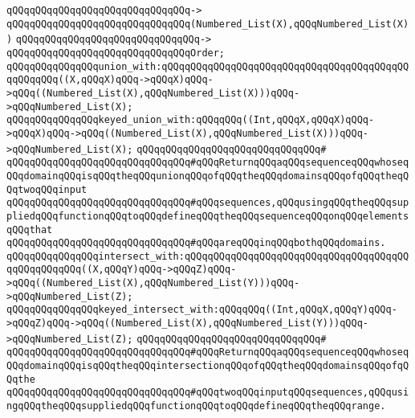 \verb|qQQqqQQqqQQqqQQqqQQqqQQqqQQqqQQq->|\newline
\verb|qQQqqQQqqQQqqQQqqQQqqQQqqQQqqQQq(Numbered_List(X),qQQqNumbered_List(X))|\newline
\verb|qQQqqQQqqQQqqQQqqQQqqQQqqQQqqQQq->|\newline
\verb|qQQqqQQqqQQqqQQqqQQqqQQqqQQqqQQqOrder;|\newline
\newline
\verb|qQQqqQQqqQQqqQQqunion_with:qQQqqQQqqQQqqQQqqQQqqQQqqQQqqQQqqQQqqQQqqQQqqQQqqQQq((X,qQQqX)qQQq->qQQqX)qQQq->qQQq((Numbered_List(X),qQQqNumbered_List(X)))qQQq->qQQqNumbered_List(X);|\newline
\verb|qQQqqQQqqQQqqQQqkeyed_union_with:qQQqqQQq((Int,qQQqX,qQQqX)qQQq->qQQqX)qQQq->qQQq((Numbered_List(X),qQQqNumbered_List(X)))qQQq->qQQqNumbered_List(X);|\newline
\verb|qQQqqQQqqQQqqQQqqQQqqQQqqQQqqQQq#|\newline
\verb|qQQqqQQqqQQqqQQqqQQqqQQqqQQqqQQq#qQQqReturnqQQqaqQQqsequenceqQQqwhoseqQQqdomainqQQqisqQQqtheqQQqunionqQQqofqQQqtheqQQqdomainsqQQqofqQQqtheqQQqtwoqQQqinput|\newline
\verb|qQQqqQQqqQQqqQQqqQQqqQQqqQQqqQQq#qQQqsequences,qQQqusingqQQqtheqQQqsuppliedqQQqfunctionqQQqtoqQQqdefineqQQqtheqQQqsequenceqQQqonqQQqelementsqQQqthat|\newline
\verb|qQQqqQQqqQQqqQQqqQQqqQQqqQQqqQQq#qQQqareqQQqinqQQqbothqQQqdomains.|\newline
\newline
\verb|qQQqqQQqqQQqqQQqintersect_with:qQQqqQQqqQQqqQQqqQQqqQQqqQQqqQQqqQQqqQQqqQQqqQQqqQQq((X,qQQqY)qQQq->qQQqZ)qQQq->qQQq((Numbered_List(X),qQQqNumbered_List(Y)))qQQq->qQQqNumbered_List(Z);|\newline
\verb|qQQqqQQqqQQqqQQqkeyed_intersect_with:qQQqqQQq((Int,qQQqX,qQQqY)qQQq->qQQqZ)qQQq->qQQq((Numbered_List(X),qQQqNumbered_List(Y)))qQQq->qQQqNumbered_List(Z);|\newline
\verb|qQQqqQQqqQQqqQQqqQQqqQQqqQQqqQQq#|\newline
\verb|qQQqqQQqqQQqqQQqqQQqqQQqqQQqqQQq#qQQqReturnqQQqaqQQqsequenceqQQqwhoseqQQqdomainqQQqisqQQqtheqQQqintersectionqQQqofqQQqtheqQQqdomainsqQQqofqQQqthe|\newline
\verb|qQQqqQQqqQQqqQQqqQQqqQQqqQQqqQQq#qQQqtwoqQQqinputqQQqsequences,qQQqusingqQQqtheqQQqsuppliedqQQqfunctionqQQqtoqQQqdefineqQQqtheqQQqrange.|\newline
\newline
\newline
\newline
